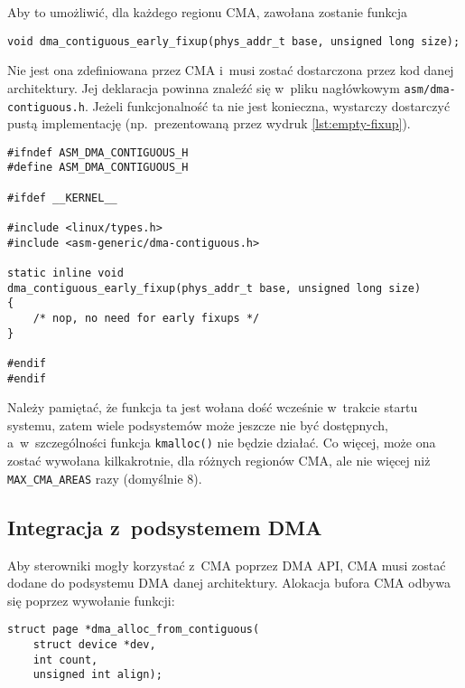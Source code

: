 Aby to umożliwić, dla każdego regionu CMA, zawołana zostanie funkcja

\begin{lstlisting}
void dma_contiguous_early_fixup(phys_addr_t base, unsigned long size);
\end{lstlisting}

Nie jest ona zdefiniowana przez CMA i~musi zostać dostarczona przez
kod danej architektury.  Jej deklaracja powinna znaleźć się w~pliku
nagłówkowym \lstinline|asm/dma-contiguous.h|.  Jeżeli funkcjonalność
ta nie jest konieczna, wystarczy dostarczyć pustą implementację
(np.\ prezentowaną przez wydruk \ref{lst:empty-fixup}).

\begin{lstlisting}[float=tbhp,caption={Plik nagłówkowy
      \lstinline|asm/dma-contiguous.h| z~pustą implementacją funkcji
      \lstinline|dma_contiguous_early_fixup()|.},label=lst:empty-fixup]
#ifndef ASM_DMA_CONTIGUOUS_H
#define ASM_DMA_CONTIGUOUS_H

#ifdef __KERNEL__

#include <linux/types.h>
#include <asm-generic/dma-contiguous.h>

static inline void
dma_contiguous_early_fixup(phys_addr_t base, unsigned long size)
{
	/* nop, no need for early fixups */
}

#endif
#endif
\end{lstlisting}

Należy pamiętać, że funkcja ta jest wołana dość wcześnie w~trakcie
startu systemu, zatem wiele podsystemów może jeszcze nie być
dostępnych, a~w~szczególności funkcja \lstinline|kmalloc()| nie będzie
działać.  Co więcej, może ona zostać wywołana kilkakrotnie, dla
różnych regionów CMA, ale nie więcej niż \lstinline|MAX_CMA_AREAS|
razy (domyślnie 8).

\subsection{Integracja z~podsystemem DMA}\label{sec:usage-integrate}

Aby sterowniki mogły korzystać z~CMA poprzez DMA API, CMA musi zostać
dodane do podsystemu DMA danej architektury.  Alokacja bufora CMA
odbywa się poprzez wywołanie funkcji:

\begin{lstlisting}
struct page *dma_alloc_from_contiguous(
	struct device *dev,
	int count,
	unsigned int align);
\end{lstlisting}

